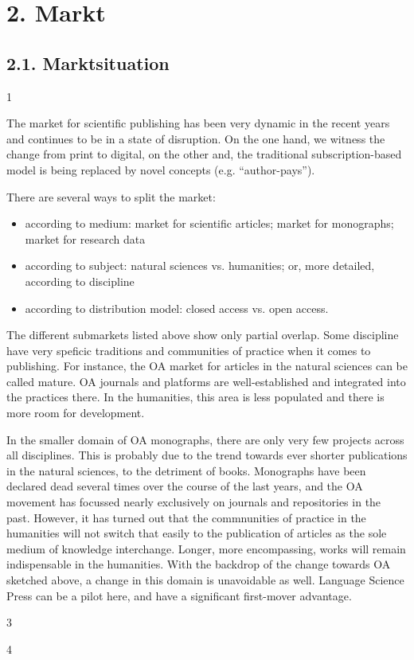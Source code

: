 \documentclass[output=guidelines,draftmode]{langscibook}
\newcommand{\background}[1]{ 
  \vspace{5mm}
  \renewcommand{\tblslinecolour}{lsDarkBlue}
  \tblssy[red]{explore2}{Background}{#1}
}
\newcommand{\langscisolution}[1]{
  \renewcommand{\tblslinecolour}{lsLightBlue}
  \tblssy{langsci}{LangSci solution}{#1}
}
\newcommand{\evaluation}[1]{
  \renewcommand{\tblslinecolour}{lsLightOrange}
  \tblssy{receipt}{Evaluation}{#1}
}
\newcommand{\othersolutions}[1]{
  \renewcommand{\tblslinecolour}{lsDarkGreenOne}
  \tblssy{more}{Other solutions}{#1}
}
\renewcommand{\tblssy}[4][black!12]{%
  \renewcommand{\langscisymbol}{#2}\renewcommand{\tblsboxcolor}{#1}
  \begin{mdframed}[style=yellowexercise,frametitle={#3}]
    #4
  \end{mdframed}
}
\begin{document}
\chapter{2. Markt}

\section{2.1. Marktsituation}

\background{1}
\langscisolution{
The market for scientific publishing has been very dynamic in the recent years and continues to be in a state of disruption. On the one hand, we witness the change from print to digital, on the other and, the traditional subscription-based model is being replaced by novel concepts (e.g. ``author-pays''). 

There are several ways to split the market: 
\begin{itemize}
 \item according to medium: market for scientific articles; market for monographs; market for research data
 \item according to subject: natural sciences vs. humanities; or, more detailed, according to discipline
 \item according to distribution model: closed access vs. open access.
\end{itemize}
 
The different submarkets listed above show only partial overlap. Some discipline have very speficic traditions and communities of practice when it comes to publishing. For instance, the OA market for articles in the natural sciences can be called mature. OA journals and platforms are well-established and integrated into the practices there. In the humanities, this area is less populated and there is more room for development.

In the smaller domain of OA monographs, there are only very few projects across all disciplines. This is probably due to the trend towards ever shorter publications in the natural sciences, to the detriment of books. Monographs have been declared dead several times over the course of the last years, and the OA movement has focussed nearly exclusively on journals and repositories in the past. However, it has turned out that the commnunities of practice in the humanities will not switch that easily to the publication of articles as the sole medium of knowledge interchange. Longer, more encompassing, works will remain indispensable in the humanities. With the backdrop of the change towards OA sketched above, a change in this domain is unavoidable as well. Language Science Press can be a pilot here, and have a significant first-mover advantage. 
}
\evaluation{3}
\othersolutions{4}
 
\end{document}
